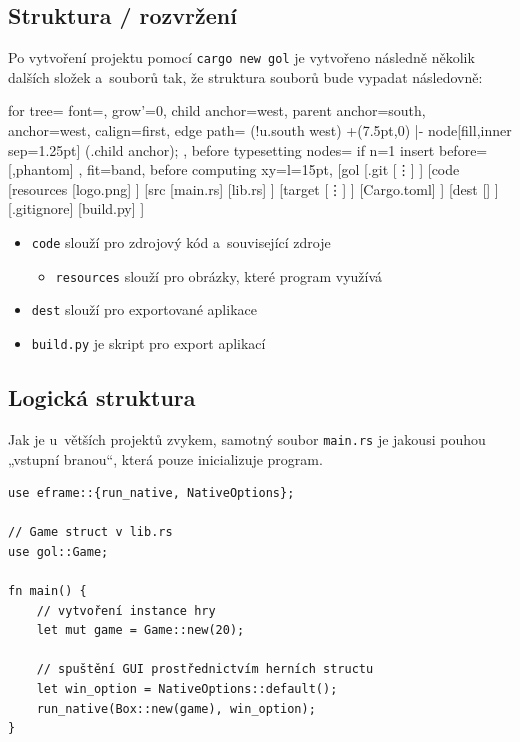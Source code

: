 \documentclass[a4paper, 12pt, twoside]{article} %
\begin{document}
	\subsection{Struktura / rozvržení}
		Po vytvoření projektu pomocí \texttt{cargo new gol} je vytvořeno následně několik dalších složek a~souborů tak, že struktura souborů bude vypadat následovně:
		\begin{center}
		\begin{forest}
			for tree={
			font=\ttfamily,
			grow'=0,
			child anchor=west,
			parent anchor=south,
			anchor=west,
			calign=first,
			edge path={
				\noexpand{}
				(!u.south west) +(7.5pt,0) |- node[fill,inner sep=1.25pt] {} (.child anchor);
			},
			before typesetting nodes={
				if n=1
				{insert before={[,phantom]}}
				{}
			},
			fit=band,
			before computing xy={l=15pt},
			}
		[gol
			[.git
			[\vdots]
			]
			[code
			[resources
				[logo.png]
			]
			[src
				[main.rs]
				[lib.rs]
			]
			[target
				[\vdots]
			]
			[Cargo.toml]
			]
			[dest
			[]
			]
			[.gitignore]
			[build.py]
		]
		\end{forest}
		\end{center}

		\begin{itemize}
			\item \texttt{code} slouží pro zdrojový kód a~související zdroje
			\begin{itemize}
				\item \texttt{resources} slouží pro obrázky, které program využívá
			\end{itemize}
			\item \texttt{dest} slouží pro exportované aplikace
			\item \texttt{build.py} je skript pro export aplikací
		\end{itemize}
		
	\subsection{Logická struktura}
		Jak je u~větších projektů zvykem, samotný soubor \texttt{main.rs} je jakousi pouhou „vstupní branou“, která pouze inicializuje program. 
		
		\begin{verbatim}
use eframe::{run_native, NativeOptions};

// Game struct v lib.rs
use gol::Game;

fn main() {
	// vytvoření instance hry
	let mut game = Game::new(20);

	// spuštění GUI prostřednictvím herních structu
	let win_option = NativeOptions::default();
	run_native(Box::new(game), win_option);
}
		\end{verbatim}
		
\end{document}
